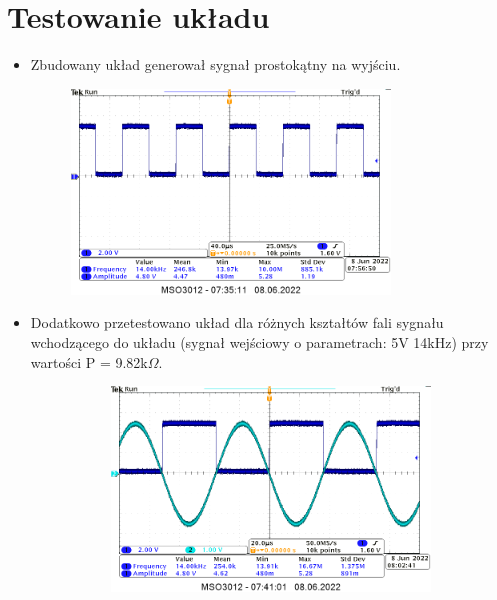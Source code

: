 \section{Testowanie układu}

\begin{itemize}
    \item Zbudowany układ generował sygnał prostokątny na wyjściu.
        \begin{figure}[H]
            \centering
            \includegraphics[width=0.8\textwidth]{img/1/1_dzialajacy_cropped.png}
            \caption{}
            \label{fig:my_label}
        \end{figure}
    \item Dodatkowo przetestowano układ dla różnych kształtów fali sygnału wchodzącego do układu (sygnał wejściowy o parametrach: 5V 14kHz) przy wartości P = 9.82k$\Omega$.
        \begin{figure}[H]
            \centering
            \begin{subfigure}[H]{0.48\textwidth}
                \includegraphics[width=\textwidth]{img/1/1_wejscie_wyjscie_cropped.png}

\end{subfigure}
\end{figure}
\end{itemize}
